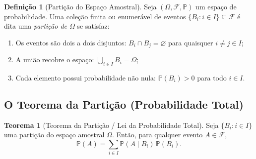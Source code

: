 \documentclass[12pt,portuguese]{article}
\theoremstyle{definition}
\newtheorem{theorem}{Teorema}
\newtheorem{definition}[definition]{Definição}
\begin{document}
\begin{definition}[Partição do Espaço Amostral]\label{def:particao}
Seja \((\Omega, \mathcal{F}, \mathbb{P})\) um espaço de probabilidade. Uma coleção finita ou enumerável de eventos \(\{B_i : i \in I\} \subseteq \mathcal{F}\) é dita uma \emph{partição de \(\Omega\)} se satisfaz:
\begin{enumerate}[label=(\alph*)]
  \item Os eventos são dois a dois disjuntos: \(B_i \cap B_j = \varnothing\) para quaisquer \(i \ne j \in I\);
  \item A união recobre o espaço: \(\bigcup_{i \in I} B_i = \Omega\);
  \item Cada elemento possui probabilidade não nula: \(\mathbb{P}(B_i) > 0\) para todo \(i \in I\).
\end{enumerate}
\end{definition}

\subsection{O Teorema da Partição (Probabilidade Total)}

\begin{theorem}[Teorema da Partição / Lei da Probabilidade Total]\label{thm:particao}
Seja \(\{B_i : i \in I\}\) uma partição do espaço amostral \(\Omega\). Então, para qualquer evento \(A \in \mathcal{F}\),
\begin{equation}\label{eq:particao}
  \mathbb{P}(A) = \sum_{i \in I} \mathbb{P}(A \mid B_i)\,\mathbb{P}(B_i).
\end{equation}
\end{theorem}
\end{document}
